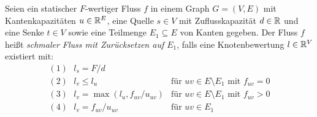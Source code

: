 \begin{definition}\label{def-thin-flow}
	Seien ein statischer $F$-wertiger Fluss $f$ in einem Graph $G=(V,E)$ mit Kantenkapazitäten $u\in\mathbb{R}^E$, eine Quelle $s\in V$ mit Zuflusskapazität $d\in\mathbb{R}$ und eine Senke $t\in V$ sowie eine Teilmenge $E_1\subseteq E$ von Kanten gegeben.
	Der Fluss $f$ heißt \emph{schmaler Fluss mit Zurücksetzen auf $E_1$}, falls eine Knotenbewertung $l\in\mathbb{R}^V$ existiert mit:
	$$\begin{array}{ll}
	(1)~~~	l_s = F/d& \\
	(2)~~~	l_v \leq l_u &\text{für $uv\in E \setminus E_1$ mit $f_{uv}=0$}\\
	(3)~~~	l_v = \max(l_u, f_{uv} / u_{uv} ) &\text{für $uv\in E\setminus E_1$ mit $f_{uv} > 0$}\\
	(4)~~~	l_v = f_{uv} / u_{uv} & \text{für $uv\in E_1$}
	\end{array}$$
\end{definition}

